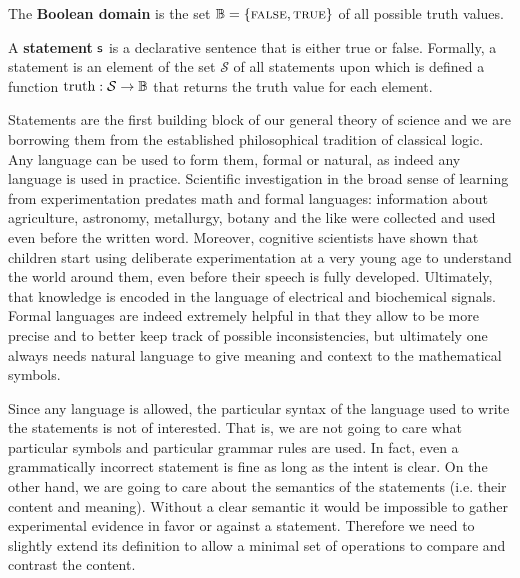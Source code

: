 \documentclass[11pt,letterpaper,fleqn]{memoir} %
\begin{document}
\begin{mathSection}
\begin{defn}
	The \textbf{Boolean domain} is the set $\mathbb{B} = \{\textsc{false}, \textsc{true}\}$ of all possible truth values.
\end{defn}


\begin{defn}\label{def_statement}
	A \textbf{statement} $\mathsf{s}$ is a declarative sentence that is either true or false. Formally, a statement is an element of the set $\mathcal{S}$ of all statements upon which is defined a function $\operatorname{truth}: \mathcal{S} \to \mathbb{B}$ that returns the truth value for each element.
\end{defn}

\end{mathSection}

Statements are the first building block of our general theory of science and we are borrowing them from the established philosophical tradition of classical logic. Any language can be used to form them, formal or natural, as indeed any language is used in practice. Scientific investigation in the broad sense of learning from experimentation predates math and formal languages: information about agriculture, astronomy, metallurgy, botany and the like were collected and used even before the written word. Moreover, cognitive scientists have shown that children start using deliberate experimentation at a very young age to understand the world around them, even before their speech is fully developed. Ultimately, that knowledge is encoded in the language of electrical and biochemical signals. Formal languages are indeed extremely helpful in that they allow to be more precise and to better keep track of possible inconsistencies, but ultimately one always needs natural language to give meaning and context to the mathematical symbols. 

Since any language is allowed, the particular syntax of the language used to write the statements is not of interested. That is, we are not going to care what particular symbols and particular grammar rules are used. In fact, even a grammatically incorrect statement is fine as long as the intent is clear. On the other hand, we are going to care about the semantics of the statements (i.e. their content and meaning). Without a clear semantic it would be impossible to gather experimental evidence in favor or against a statement. Therefore we need to slightly extend its definition to allow a minimal set of operations to compare and contrast the content.
\end{document}
